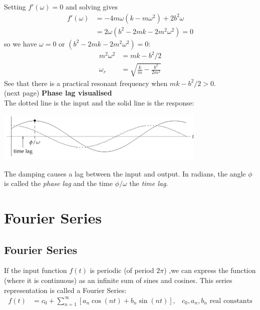 \documentclass{report}
\begin{document}
Setting $f'(\omega)=0$ and solving gives
\begin{align*}
f'(\omega)&=-4m\omega(k-m\omega^2)+2b^2\omega\\
&=2\omega(b^2-2mk-2m^2\omega^2)=0
\end{align*}
so we have $\omega=0$ or $(b^2-2mk-2m^2\omega^2)=0$:
\begin{align*}
m^2\omega^2&=mk-b^2/2\\
\omega_r&=\sqrt{\frac{k}{m}-\frac{b^2}{2m^2}}
\end{align*}
See that there is a practical resonant frequency when $mk-b^2/2>0$.\\
(next page)
\newpage
\noindent\textbf{Phase lag visualised}\\
The dotted line is the input and the solid line is the response:
\begin{center}
\includegraphics[width=10cm]{35}\\
\end{center}
The damping causes a lag between the input and output. In radians, the angle $\phi$ is called the
\textit{phase lag} and the time $\phi/\omega$ the \textit{time lag}.
\newpage

\subsection{}


\newpage

\section{Fourier Series}
\subsection{Fourier Series}
If the input function $f(t)$ is periodic (of period $2\pi$)
,we can express the function (where it is continuous) as an
infinite sum of sines and cosines.
This series representation is called a Fourier Series:
\begin{align*}
f(t)&=c_0+\sum_{n=1}^{\infty}[a_n\cos(nt)+b_n\sin(nt)], 
& \text{$c_0, a_n, b_n$ real constants}
\end{align*}
\end{document}
